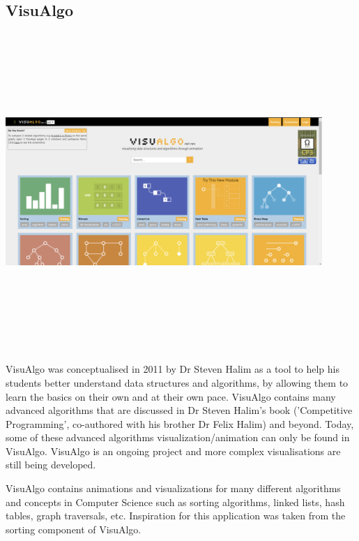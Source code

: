 \subsection{VisuAlgo}
\begin{center}
    \includegraphics[width=12cm,height=12cm,keepaspectratio]{images/visualgonet}
\end{center}
VisuAlgo \cite{sorting_2} was conceptualised in 2011 by Dr Steven Halim as a tool to help his students better understand data structures and algorithms, by allowing them to learn the basics on their own and at their own pace. VisuAlgo contains many advanced algorithms that are discussed in Dr Steven Halim's book ('Competitive Programming', co-authored with his brother Dr Felix Halim) and beyond. Today, some of these advanced algorithms visualization/animation can only be found in VisuAlgo. VisuAlgo is an ongoing project and more complex visualisations are still being developed.
\par
\bigskip
VisuAlgo contains animations and visualizations for many different algorithms and concepts in Computer Science such as sorting algorithms, linked lists, hash tables, graph traversals, etc. Inspiration for this application was taken from the sorting component of VisuAlgo.
